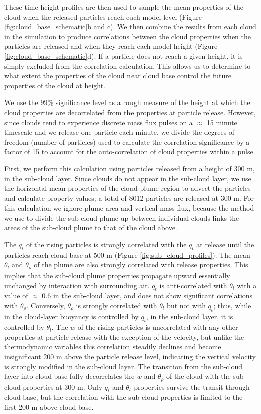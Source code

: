 \documentclass[acp]{copernicus}
\begin{document}
These time-height profiles are then used to sample the mean properties of the 
cloud when the released particles reach each model level (Figure 
\ref{fig:cloud_base_schematic}b and c).  We then combine the results from each 
cloud in the simulation to produce correlations between the cloud properties 
when the particles are released and when they reach each model height (Figure 
\ref{fig:cloud_base_schematic}d).  If a particle does not reach a given 
height, it is simply excluded from the correlation calculation.  This allows us 
to determine to what extent the properties of the cloud near cloud base control 
the future properties of the cloud at height.

We use the 99\% significance level as a rough measure of the height at which 
the cloud properties are decorrelated from the properties at particle release.  
However, since clouds tend to experience discrete mass flux pulses on a 
$\approx$ 15 minute timescale and we release one particle each minute, we 
divide the degrees of freedom (number of particles) used to calculate the 
correlation significance by a factor of 15 to account for the auto-correlation 
of cloud properties within a pulse.

First, we perform this calculation using particles released from a height of 
300 m, in the sub-cloud layer.  Since clouds do not appear in the sub-cloud 
layer, we use the horizontal mean properties of the cloud plume region to 
advect the particles and calculate property values; a total of 8012 particles 
are released at 300 m.  For this calculation we ignore plume area and vertical 
mass flux, because the method we use to divide the sub-cloud plume up between 
individual clouds links the areas of the sub-cloud plume to that of the cloud
above.

The $q_t$ of the rising particles is strongly correlated with the $q_t$ at 
release until the particles reach cloud base at 500 m (Figure 
\ref{fig:sub_cloud_profiles}).  The mean $\theta_l$ and $\theta_\rho$ of 
the plume are also strongly correlated with release properties.  This implies 
that the sub-cloud plume properties propagate upward essentially unchanged by 
interaction with surrounding air.  $q_t$ is anti-correlated with $\theta_l$ 
with a value of $\approx$ 0.6 in the sub-cloud layer, and does not show 
significant correlations with $\theta_\rho$.  Conversely, $\theta_\rho$ is 
strongly correlated with $\theta_l$ but not with $q_t$; thus, while in the 
cloud-layer buoyancy is controlled by $q_t$, in the sub-cloud layer, it is 
controlled by $\theta_l$.  The $w$ of the rising particles is uncorrelated 
with any other properties at particle release with the exception of the 
velocity, but unlike the thermodynamic variables this correlation steadily 
declines and become insignificant 200 m above the particle release level, 
indicating the vertical velocity is strongly modified in the sub-cloud layer.  
The transition from the sub-cloud layer into cloud base fully decorrelates the 
$w$ and $\theta_\rho$ of the cloud with the sub-cloud properties at 300 m.
Only $q_t$ and $\theta_l$ properties survive the transit through cloud base, 
but the correlation with the sub-cloud properties is limited to the first 200 m 
above cloud base.
\end{document}
